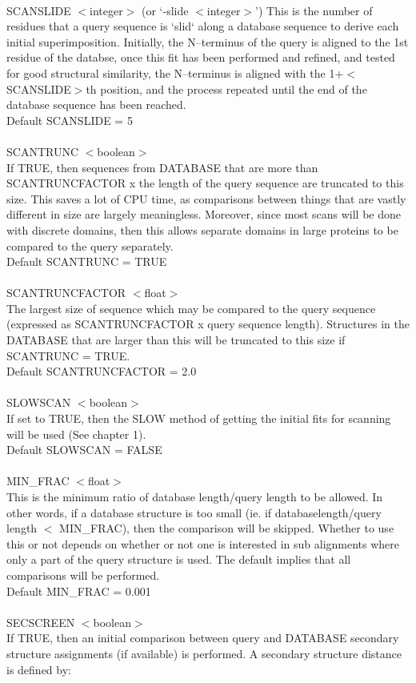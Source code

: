 \\
SCANSLIDE $<$integer$>$ (or `-slide $<$integer$>$')
This is the number of residues that a query sequence is `slid`
along a database sequence to derive each initial superimposition. 
Initially, the N--terminus of the query is aligned to the 1st
residue of the databse, once this fit has been performed and
refined, and tested for good structural similarity, the N--terminus
is aligned with  the 1+$<$SCANSLIDE$>$th position, and the process
repeated until the end of the database sequence has been reached.\\
Default SCANSLIDE = 5 \\
\\
SCANTRUNC $<$boolean$>$\\
If TRUE, then sequences from DATABASE that are more than
SCANTRUNCFACTOR x the length of the query sequence are truncated to
this size.  This saves a lot of CPU time, as comparisons between 
things that are vastly different in size are largely meaningless. 
Moreover, since most scans will be done with discrete domains, then
this allows separate domains in large proteins to be compared 
to the query separately.\\
Default SCANTRUNC = TRUE\\
\\
SCANTRUNCFACTOR $<$float$>$\\
The largest size of sequence which may be compared to the query 
sequence (expressed as SCANTRUNCFACTOR x query sequence length). 
Structures in the DATABASE that are larger than this will be
truncated  to this size if SCANTRUNC = TRUE.\\
Default SCANTRUNCFACTOR = 2.0\\
\\
SLOWSCAN $<$boolean$>$\\
If set to TRUE, then the SLOW method of getting the initial fits
for scanning will be used (See chapter 1).\\
Default SLOWSCAN = FALSE\\
\\
MIN\_FRAC $<$float$>$\\
This is the minimum ratio of database length/query length to be 
allowed.  In other words, if a database structure is too small 
(ie. if databaselength/query length $<$ MIN\_FRAC), then the
comparison will be skipped.  Whether to use this or not depends on
whether or not one is interested in sub alignments where only a
part of the query structure is used.  The default implies that all
comparisons will be performed.\\
Default MIN\_FRAC = 0.001\\
\\
SECSCREEN $<$boolean$>$\\
If TRUE, then an initial comparison between query and DATABASE
secondary structure assignments (if available) is performed.  A
secondary structure distance is defined by:\\

